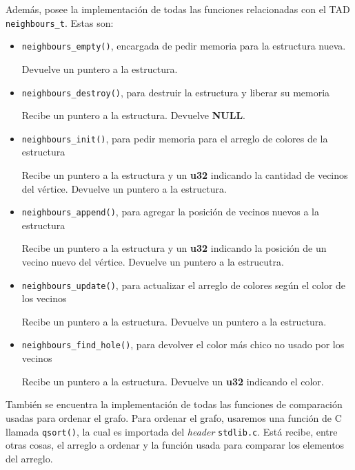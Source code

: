 \documentclass[11pt]{article}   	%
\begin{document}
Además, posee la implementación de todas las funciones relacionadas
con el TAD \texttt{neighbours\_t}. Estas son:

\begin{itemize}
\item \texttt{neighbours\_empty()}, encargada de pedir memoria para la estructura nueva.

Devuelve un puntero a la estructura.
\item \texttt{neighbours\_destroy()}, para destruir la estructura y liberar su memoria

Recibe un puntero a la estructura. Devuelve \textbf{NULL}.
\item \texttt{neighbours\_init()}, para pedir memoria para el arreglo de colores de la estructura

Recibe un puntero a la estructura y un \textbf{u32} indicando la cantidad de vecinos del vértice. Devuelve
un puntero a la estructura.
\item \texttt{neighbours\_append()}, para agregar la posición de vecinos nuevos a la estructura

Recibe un puntero a la estructura y un \textbf{u32} indicando la posición de un vecino nuevo del vértice.
Devuelve un puntero a la estrucutra.
\item \texttt{neighbours\_update()}, para actualizar el arreglo de colores según el color de los vecinos

Recibe un puntero a la estructura. Devuelve un puntero a la estructura.
\item \texttt{neighbours\_find\_hole()}, para devolver el color más chico no usado por los vecinos

Recibe un puntero a la estructura. Devuelve un \textbf{u32} indicando el color.
\end{itemize}

También se encuentra la implementación de todas las funciones de comparación usadas para ordenar el grafo.
Para ordenar el grafo, usaremos una función de C llamada \texttt{qsort()}, la cual es importada del
\emph{header} \texttt{stdlib.c}. Está recibe, entre otras cosas, el arreglo a ordenar y la función usada
para comparar los elementos del arreglo.
\end{document}
